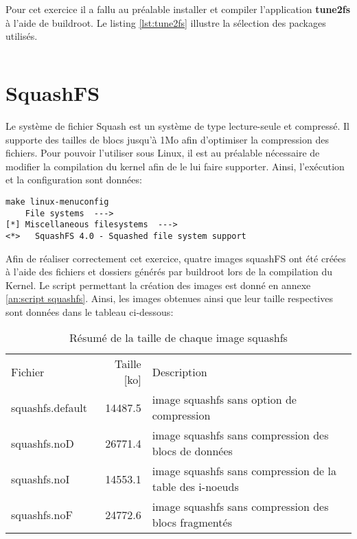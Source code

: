 Pour cet exercice il a fallu au préalable installer et compiler l'application \textbf{tune2fs} à l'aide de buildroot. Le listing \ref{lst:tune2fs} illustre la sélection des packages utilisés.
\begin{lstlisting}[style=Bash]

\end{lstlisting}

\section{SquashFS}
Le système de fichier Squash est un système de type lecture-seule et compressé. Il supporte des tailles de blocs jusqu'à 1Mo afin d'optimiser la compression des fichiers. Pour pouvoir l'utiliser sous Linux, il est au préalable nécessaire de modifier la compilation du kernel afin de le lui faire supporter. Ainsi, l'exécution et la configuration sont données:

\begin{lstlisting}
make linux-menuconfig
    File systems  --->
[*] Miscellaneous filesystems  --->
<*>   SquashFS 4.0 - Squashed file system support
\end{lstlisting}

Afin de réaliser correctement cet exercice, quatre images squashFS ont été créées à l'aide des fichiers et dossiers générés par buildroot lors de la compilation du Kernel. Le script permettant la création des images est donné en annexe \ref{an:script squashfs}. Ainsi, les images obtenues ainsi que leur taille respectives sont données dans le tableau ci-dessous:
\begin{table}[H]
	\centering
	\begin{tabular}{lrp{10cm}}
	Fichier & Taille [ko] & Description\\
	squashfs.default & 14487.5 & image squashfs sans option de compression\\
	squashfs.noD & 26771.4 & image squashfs sans compression des blocs de données\\
	squashfs.noI & 14553.1 & image squashfs sans compression de la table des i-noeuds\\
	squashfs.noF & 24772.6 & image squashfs sans compression des blocs fragmentés
	\end{tabular}
	\caption{\label{table:squashfs size}Résumé de la taille de chaque image squashfs}
\end{table}


